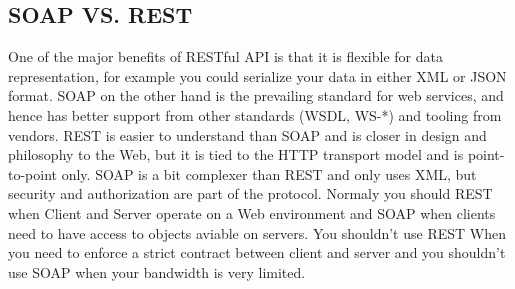 \documentclass[12pt]{article}
\begin{document}
\subsection{SOAP VS. REST}
One of the major benefits of RESTful API is that it is flexible for data representation, for example you could serialize your data in either XML or JSON format. SOAP on the other hand is the prevailing standard for web services, and hence has better support from other standards (WSDL, WS-*) and tooling from vendors. REST is easier to understand than SOAP and is closer in design and philosophy to the Web, but it is tied to the HTTP transport model and is point-to-point only. SOAP is a bit complexer than REST and only uses XML, but security and authorization are part of the protocol. Normaly you should REST when Client and Server operate on a Web environment and SOAP when clients need to have access to objects aviable on servers. You shouldn't use REST When you need to enforce a strict contract between client and server and you shouldn't use SOAP when your bandwidth is very limited.
\end{document}
